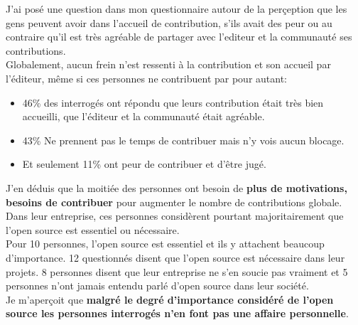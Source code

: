 			J'ai posé une question dans mon questionnaire autour de la perçeption que les gens peuvent avoir dans l'accueil de contribution, s'ils avait des peur ou au contraire qu'il est très agréable de partager avec l'editeur et la communauté ses contributions.\\

			Globalement, aucun frein n'est ressenti à la contribution et son accueil par l'éditeur, même si ces personnes ne contribuent par pour autant:

			\begin{itemize}[label=\textbullet, font=\LARGE \color{burntorange}]
				\item 46\% des interrogés ont répondu que leurs contribution était très bien accueilli, que l'éditeur et la communauté était agréable.
				\item 43\% Ne prennent pas le temps de contribuer mais n'y vois aucun blocage.
				\item Et seulement 11\% ont peur de contribuer et d'être jugé.
			\end{itemize}

			J'en déduis que la moitiée des personnes ont besoin de \textbf{plus de motivations, besoins de contribuer} pour augmenter le nombre de contributions globale.\\

			Dans leur entreprise, ces personnes considèrent pourtant majoritairement que l'open source est essentiel ou nécessaire.\\

			Pour 10 personnes, l'open source est essentiel et ils y attachent beaucoup d'importance.
			12 questionnés disent que l'open source est nécessaire dans leur projets. 8 personnes disent que leur entreprise ne s'en soucie pas vraiment et 5 personnes n'ont jamais entendu parlé d'open source dans leur société.\\

			Je m'aperçoit que \textbf{malgré le degré d'importance considéré de l'open source les personnes interrogés n'en font pas une affaire personnelle}.

